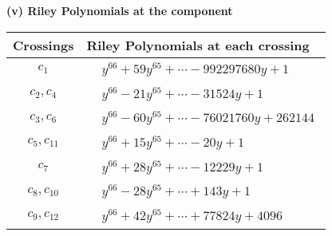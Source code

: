 \documentclass[1p]{elsarticle_modified}
\theoremstyle{definition}
\begin{document}
\flushleft \textbf{(v) Riley Polynomials at the component}\newline \\
\begin{tabular}{m{50pt}|m{274pt}}
Crossings & \hspace{64pt}Riley Polynomials at each crossing \\
\hline $$\begin{aligned}c_{1}\end{aligned}$$&$\begin{aligned}
&y^{66}+59 y^{65}+\cdots-992297680 y+1
\end{aligned}$\\
\hline $$\begin{aligned}c_{2},c_{4}\end{aligned}$$&$\begin{aligned}
&y^{66}-21 y^{65}+\cdots-31524 y+1
\end{aligned}$\\
\hline $$\begin{aligned}c_{3},c_{6}\end{aligned}$$&$\begin{aligned}
&y^{66}-60 y^{65}+\cdots-76021760 y+262144
\end{aligned}$\\
\hline $$\begin{aligned}c_{5},c_{11}\end{aligned}$$&$\begin{aligned}
&y^{66}+15 y^{65}+\cdots-20 y+1
\end{aligned}$\\
\hline $$\begin{aligned}c_{7}\end{aligned}$$&$\begin{aligned}
&y^{66}+28 y^{65}+\cdots-12229 y+1
\end{aligned}$\\
\hline $$\begin{aligned}c_{8},c_{10}\end{aligned}$$&$\begin{aligned}
&y^{66}-28 y^{65}+\cdots+143 y+1
\end{aligned}$\\
\hline $$\begin{aligned}c_{9},c_{12}\end{aligned}$$&$\begin{aligned}
&y^{66}+42 y^{65}+\cdots+77824 y+4096
\end{aligned}$\\
\hline
\end{tabular}\\~\\
\end{document}
